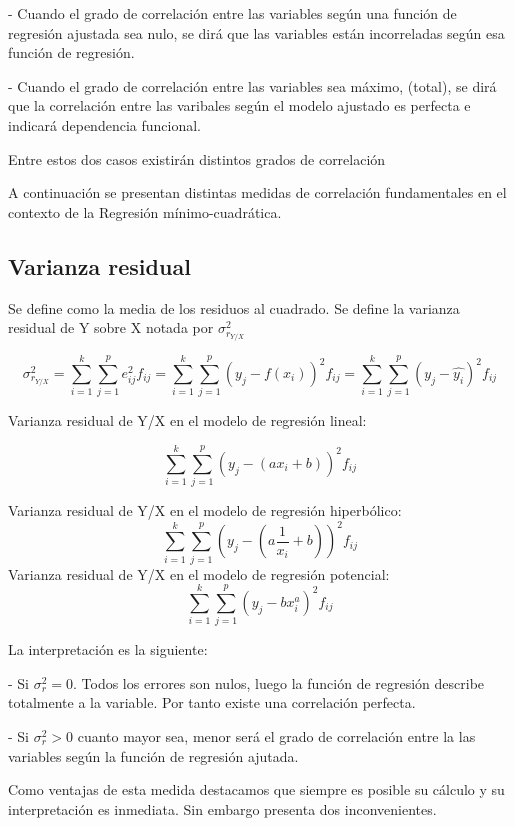 \documentclass{article}
\begin{document}
- Cuando el grado de correlación entre las variables según una función de regresión ajustada sea nulo, se dirá que las variables están incorreladas según esa función de regresión.

- Cuando el grado de correlación entre las variables sea máximo, (total), se dirá que la correlación entre las varibales según el modelo ajustado es perfecta e indicará dependencia funcional.

Entre estos dos casos existirán distintos grados de correlación

A continuación se presentan distintas medidas de correlación fundamentales en el contexto de la Regresión mínimo-cuadrática.

\subsection{Varianza residual}
Se define como la media de los residuos al cuadrado. Se define la varianza residual de Y sobre X notada por $\sigma_{r_{Y/X}}^2 $

$$ \sigma_{r_{Y/X}}^2 = \sum_{i=1}^k \sum_{j=1}^p e_{ij}^2 f_{ij} =  \sum_{i=1}^k \sum_{j=1}^p ( y_j - f(x_i))^2 f_{ij} = \sum_{i=1}^k \sum_{j=1}^p (y_j -\hat{y_i})^2 f_{ij} $$

Varianza residual de Y/X en el modelo de regresión lineal:

$$ \sum_{i=1}^k \sum_{j=1}^p ( y_j - (ax_i +b) )^2 f_{ij} $$

Varianza residual de Y/X en el modelo de regresión hiperbólico:
$$ \sum_{i=1}^k \sum_{j=1}^p ( y_j - (a\frac{1}{x_i} +b) )^2 f_{ij} $$
Varianza residual de Y/X en el modelo de regresión potencial:
$$\sum_{i=1}^k \sum_{j=1}^p ( y_j - bx_i^a )^2 f_{ij} $$

La interpretación es la siguiente: 

- Si $\sigma_r^2 = 0$. Todos los errores son nulos, luego la función de regresión describe totalmente a la variable. Por tanto existe una correlación perfecta.

- Si $\sigma_r^2 > 0$ cuanto mayor sea, menor será el grado de correlación entre la las variables según la función de regresión ajutada.

\vspace{2mm}

Como ventajas de esta medida destacamos que siempre es posible su cálculo y su interpretación es inmediata. Sin embargo presenta dos inconvenientes.

\vspace{2mm}
\end{document}
